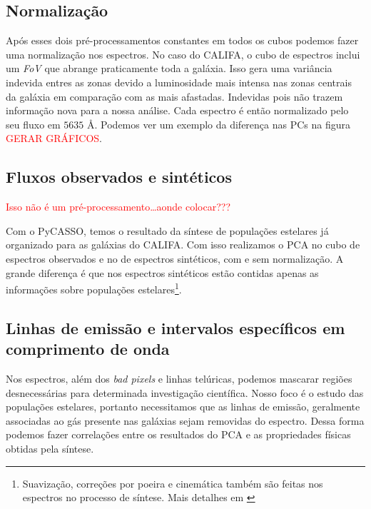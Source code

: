 \subsection{Normalização}
\label{sec:UsoPCA:PCAlidades:norm}

Após esses dois pré-processamentos constantes em todos os cubos podemos fazer uma normalização nos espectros. No caso do
CALIFA, o cubo de espectros inclui um {\em FoV} que abrange praticamente toda a galáxia. Isso gera uma variância
indevida entres as zonas devido a luminosidade mais intensa nas zonas centrais da galáxia em comparação com as mais
afastadas. Indevidas pois não trazem informação nova para a nossa análise. Cada espectro é então normalizado pelo seu
fluxo em $5635$ \AA. Podemos ver um exemplo da diferença nas PCs na figura \fixme \textcolor{red}{GERAR GRÁFICOS}.

\subsection{Fluxos observados e sintéticos}
\label{sec:UsoPCA:PCAlidades:flux}

\fixme \textcolor{red}{Isso não é um pré-processamento\ldots aonde colocar???}

Com o PyCASSO, temos o resultado da síntese de populações estelares já organizado para as galáxias do CALIFA. Com isso
realizamos o PCA no cubo de espectros observados e no de espectros sintéticos, com e sem normalização. A grande
diferença é que nos espectros sintéticos estão contidas apenas as informações sobre populações
estelares\footnote{Suavização, correções por poeira e cinemática também são feitas nos espectros no processo de síntese.
Mais detalhes em \citet{CidFernandes2005}}.

\subsection{Linhas de emissão e intervalos específicos em comprimento de onda}
\label{sec:UsoPCA:PCAlidades:emlin}

Nos espectros, além dos {\em bad pixels} e linhas telúricas, podemos mascarar regiões desnecessárias para determinada
investigação científica. Nosso foco é o estudo das populações estelares, portanto necessitamos que as linhas de emissão,
geralmente associadas ao gás presente nas galáxias \fixme sejam removidas do espectro. Dessa forma podemos fazer
correlações entre os resultados do PCA e as propriedades físicas obtidas pela síntese.

